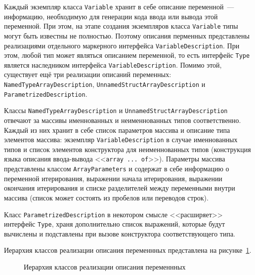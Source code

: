 \documentclass[times,specification,annotation]{style/itmo-student-thesis/itmo-student-thesis}
\begin{document}
Каждый экземпляр класса \texttt{Variable} хранит в себе описание переменной~--- информацию, необходимую для генерации кода ввода или вывода этой переменной. При этом, на этапе создания экземпляров класса \texttt{Variable} типы могут быть известны не полностью. Поэтому описания перменных представлены реализациями отдельного маркерного интерфейса \texttt{VariableDescription}. При этом, любой тип может являться описанием переменной, то есть интерфейс \texttt{Type} является наследником интерфейса \texttt{VariableDescription}. Помимо этой, существует ещё три реализации описаний переменных: \texttt{NamedTypeArrayDescription}, \texttt{UnnamedStructArrayDescription} и \texttt{ParametrizedDescription}.

Классы \texttt{NamedTypeArrayDescription} и \texttt{UnnamedStructArrayDescription} отвечают за массивы именнованных и неименнованных типов соответственно. Каждый из них хранит в себе список параметров массива и описание типа элементов массива: экземпляр \texttt{VariableDescription} в случае именнованных типов и список элементов конструктора для неименнованных типов (конструкция языка описания ввода-вывода <<\texttt{array ... of}>>). Параметры массива представлены классом \texttt{ArrayParameters} и содержат в себе информацию о переменной итерирования, выражении начала итерирования, выражении окончания итерирования и списке разделителей между переменными внутри массива (список может состоять из пробелов или переводов строк).

Класс \texttt{ParametrizedDescription} в некотором смысле <<расширяет>> интерфейс \texttt{Type}, храня дополнительно список выражений, которые будут вычислены и подставлены при вызове конструктора соответствующего типа.

Иерархия классов реализации описания переменнных представлена на рисунке~\ref{descriptions-classes-hierarchy}.

\begin{figure}[!h]
\caption{Иерархия классов реализации описания переменнных}\label{descriptions-classes-hierarchy}
\centering
{}
\end{figure}
\end{document}

